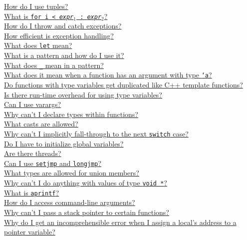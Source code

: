 \begin{small}
\hyperlink{faq:usetuples}{How do I use tuples?}\\
\hyperlink{faq:arrayinit}{What is \texttt{\lb for i < {\it expr}$_1$ : {\it expr}$_2$\rb}?}\\
\hyperlink{faq:exns}{How do I throw and catch exceptions?}\\
\hyperlink{faq:exn-efficiency}{How efficient is exception handling?}\\
\hyperlink{faq:let}{What does \texttt{let} mean?}\\
\hyperlink{faq:pattern}{What is a pattern and how do I use it?}\\
\hyperlink{faq:uscore-pattern}{What does \texttt{_} mean in a pattern?}\\
\hyperlink{faq:polymorphic}{What does it mean when a function has an argument with type \texttt{`a}?}\\
\hyperlink{faq:templates}{Do functions with type variables get duplicated like C++ template functions?\\  Is there run-time overhead for using type variables?}\\
\hyperlink{faq:vararg}{Can I use varargs?}\\
\hyperlink{faq:typesinfunctions}{Why can't I declare types within functions?}\\
\hyperlink{faq:casts}{What casts are allowed?}\\
\hyperlink{faq:implicitfallthru}{Why can't I implicitly fall-through to the next \texttt{switch} case?}\\
\hyperlink{faq:globalinit}{Do I have to initialize global variables?}\\
\hyperlink{faq:threads}{Are there threads?}\\
\hyperlink{faq:setjmp}{Can I use \texttt{setjmp} and \texttt{longjmp}?}\\
\hyperlink{faq:uniontypes}{What types are allowed for union members?}\\
\hyperlink{faq:voidstar2}{Why can't I do anything with values of type \texttt{void *}?}\\
\hyperlink{faq:aprintf}{What is \texttt{aprintf}?}\\
\hyperlink{faq:commandline}{How do I access command-line arguments?}\\
\hyperlink{faq:stackpointer}{Why can't I pass a stack pointer to certain functions?}\\
\hyperlink{faq:localaddress}{Why do I get an incomprehensible error when I assign a local's address to a pointer variable?}\\

\end{small}
